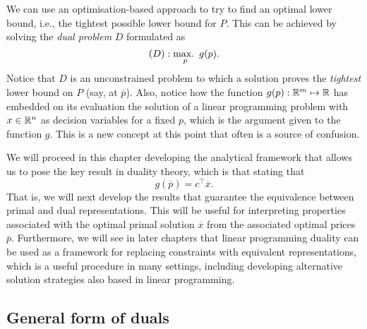 We can use an optimisation-based approach to try to find an optimal lower bound, i.e., the tightest possible lower bound for $P$. This can be achieved by solving the \emph{dual problem} $D$ formulated as 
%
\begin{equation*}
	(D) : \mathop{\text{max.~}}_p g(p).
\end{equation*}
%
Notice that $D$ is an unconstrained problem to which a solution proves the \emph{tightest} lower bound on $P$ (say, at $\overline{p}$). Also, notice how the function $g(p) : \mathbb{R}^m \mapsto \mathbb{R}$ has embedded on its evaluation the solution of a linear programming problem with $x \in \mathbb{R}^n$ as decision variables for a fixed $p$, which is the argument given to the function $g$. This is a new concept at this point that often is a source of confusion. 

We will proceed in this chapter developing the analytical framework that allows us to pose the key result in duality theory, which is that stating that 
%
\begin{equation*}
	g(\overline{p}) = c^\top \overline{x}.	
\end{equation*}
%
That is, we will next develop the results that guarantee the equivalence between primal and dual representations. This will be useful for interpreting properties associated with the optimal primal solution $\overline{x}$ from the associated optimal prices $\overline{p}$. Furthermore, we will see in later chapters that linear programming duality can be used as a framework for replacing constraints with equivalent representations, which is a useful procedure in many settings, including developing alternative solution strategies also based in linear programming. 


\subsection{General form of duals}

